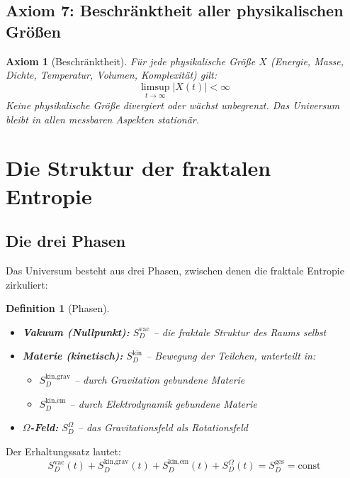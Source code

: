 \documentclass[12pt,a4paper]{article}
\newtheorem{axiom}{Axiom}
\newtheorem{definition}{Definition}
\begin{document}
\subsection{Axiom 7: Beschränktheit aller physikalischen Größen}

\begin{axiom}[Beschränktheit]
Für jede physikalische Größe $X$ (Energie, Masse, Dichte, Temperatur, Volumen, Komplexität) gilt:
\begin{equation}
\boxed{\limsup_{t \to \infty} |X(t)| < \infty}
\end{equation}
Keine physikalische Größe divergiert oder wächst unbegrenzt. Das Universum bleibt in allen messbaren Aspekten stationär.
\end{axiom}

\section{Die Struktur der fraktalen Entropie}

\subsection{Die drei Phasen}

Das Universum besteht aus drei Phasen, zwischen denen die fraktale Entropie zirkuliert:

\begin{definition}[Phasen]
\begin{itemize}
    \item \textbf{Vakuum (Nullpunkt):} $S_D^{\text{vac}}$ – die fraktale Struktur des Raums selbst
    \item \textbf{Materie (kinetisch):} $S_D^{\text{kin}}$ – Bewegung der Teilchen, unterteilt in:
    \begin{itemize}
        \item $S_D^{\text{kin,grav}}$ – durch Gravitation gebundene Materie
        \item $S_D^{\text{kin,em}}$ – durch Elektrodynamik gebundene Materie
    \end{itemize}
    \item \textbf{$\Omega$-Feld:} $S_D^{\Omega}$ – das Gravitationsfeld als Rotationsfeld
\end{itemize}
\end{definition}

Der Erhaltungssatz lautet:
\begin{equation}
S_D^{\text{vac}}(t) + S_D^{\text{kin,grav}}(t) + S_D^{\text{kin,em}}(t) + S_D^{\Omega}(t) = S_D^{\text{ges}} = \text{const}
\end{equation}
\end{document}
